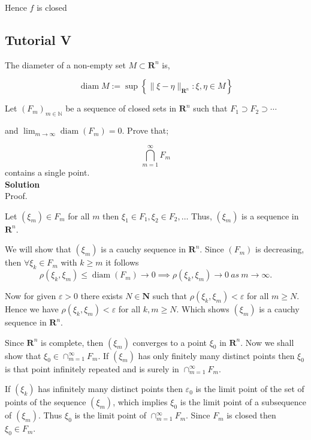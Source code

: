 \documentclass{article}
\begin{document}
Hence $f$ is  closed

\subsection{Tutorial V}

The diameter of a non-empty set $M \subset \mathbf{R}^{n}$ is,

$$
\operatorname{diam} M:=\sup \left\{\|\xi-\eta\|_{\mathbf{R}^{n}}: \xi, \eta \in M\right\}
$$

Let $\left(F_{m}\right)_{m \in \mathbb{N}}$ be a sequence of closed sets in $\mathbf{R}^{n}$ such that $F_{1} \supset F_{2} \supset \cdots$ 

and $\lim _{m \rightarrow \infty} \operatorname{diam}\left(F_{m}\right)=0$. Prove that;

$$\bigcap_{m=1}^\infty F_m$$
contains a single point.\\


\textbf{Solution}\\

Proof. 

Let $\left(\xi_{m}\right) \in F_{m}$ for all $m$ then $\xi_{1} \in F_{1}, \xi_{2} \in F_{2}, \ldots$ Thus, $\left(\xi_{m}\right)$ is a sequence in $\mathbf{R}^{n}$.

We will show that $\left(\xi_{m}\right)$ is a cauchy sequence in $\mathbf{R}^{n}$. Since $\left(F_{m}\right)$ is decreasing, then $\forall \xi_{k} \in F_{m}$ with $k \geq m$ it follows
$$\rho\left(\xi_{k}, \xi_{m}\right) \leq \operatorname{diam}\left(F_{m}\right) \longrightarrow 0 \implies \rho\left(\xi_{k}, \xi_{m}\right) \longrightarrow 0~as~ m \longrightarrow \infty.$$

Now for given $\varepsilon>0$ there exists $N \in \mathbf{N}$ such that $\rho\left(\xi_{k}, \xi_{m}\right)<\varepsilon$ for all $m \geq N$. Hence we have $\rho\left(\xi_{k}, \xi_{m}\right)<\varepsilon$ for all $k, m \geq N$. Which shows $\left(\xi_{m}\right)$ is a cauchy sequence in $\mathbf{R}^{n}$.

Since $\mathbf{R}^{n}$ is complete, then $\left(\xi_{m}\right)$ converges to a point $\xi_{0}$ in $\mathbf{R}^{n}$. Now we shall show that $\xi_{0} \in \cap_{m=1}^{\infty} F_{m}$. If $\left(\xi_{m}\right)$ has only finitely many distinct points then $\xi_{0}$ is that point infinitely repeated and is surely in $\cap_{m=1}^{\infty} F_{m}$.

If $\left(\xi_{k}\right)$ has infinitely many distinct points then $\varepsilon_{0}$ is the limit point of the set of points of the sequence $\left(\xi_{m}\right)$, which implies $\xi_{0}$ is the limit point of a subsequence of $\left(\xi_{m}\right)$. Thus $\xi_{0}$ is the limit point of $\cap_{m=1}^{\infty} F_{m}$. Since $F_{m}$ is closed then $\xi_{0} \in F_{m}$.
\end{document}
